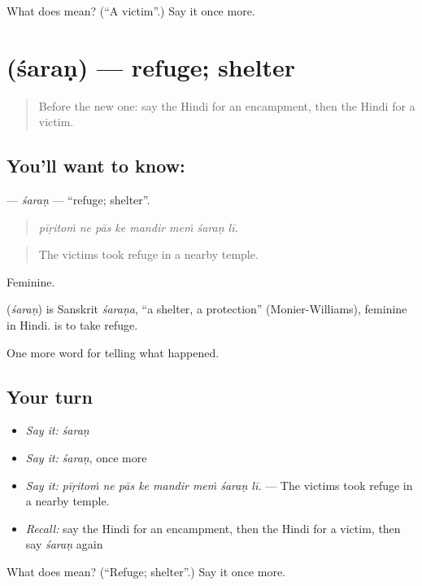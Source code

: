 \begin{tcolorbox}[breakable,colback=teal!4,colframe=teal!35!black,title={Before you move on}]
What does  mean? (\textquotedblleft{}A victim\textquotedblright{}.) Say it once more.
\end{tcolorbox}
\section[\texorpdfstring{\hi{शरण} (śaraṇ)}{शरण (śaraṇ)}]{ (śaraṇ) — refuge; shelter}

\label{lesson:HI-C309-saran}



\begin{quote}
Before the new one: say the Hindi for an encampment, then the Hindi for a victim.
\end{quote}

\subsection*{You'll want to know: }
\textbf{} — \emph{śaraṇ} — \textquotedblleft{}refuge; shelter\textquotedblright{}.

\begin{quote}
       
\end{quote}

\begin{quote}
\emph{pīṛitoṁ ne pās ke mandir meṁ śaraṇ lī.}
\end{quote}

\begin{quote}
The victims took refuge in a nearby temple.
\end{quote}

Feminine.

\begin{cousinweb}
\textbf{} (\emph{śaraṇ}) is Sanskrit \emph{śaraṇa}, \textquotedblleft{}a shelter, a protection\textquotedblright{} (Monier-Williams), feminine in Hindi. \textbf{ } is to take refuge.
\end{cousinweb}

\begin{grammarlens}[title={What you've built}]
One more word for telling what happened.
\end{grammarlens}

\subsection*{Your turn}
\begin{itemize}
\raggedright
  \item \emph{Say it:} \emph{śaraṇ}
  \item \emph{Say it:} \emph{śaraṇ}, once more
  \item \emph{Say it:} \emph{pīṛitoṁ ne pās ke mandir meṁ śaraṇ lī.} — The victims took refuge in a nearby temple.
  \item \emph{Recall:} say the Hindi for an encampment, then the Hindi for a victim, then say \emph{śaraṇ} again
\end{itemize}

\begin{tcolorbox}[breakable,colback=teal!4,colframe=teal!35!black,title={Before you move on}]
What does  mean? (\textquotedblleft{}Refuge; shelter\textquotedblright{}.) Say it once more.
\end{tcolorbox}
